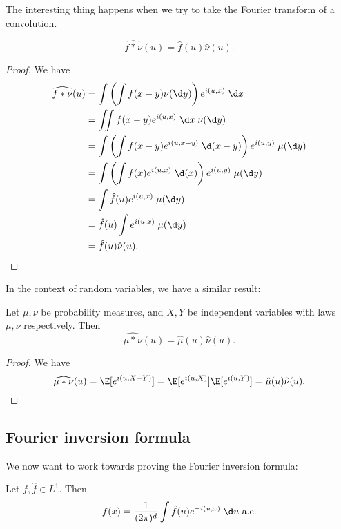 \documentclass[a4paper]{article}
\begin{document}
The interesting thing happens when we try to take the Fourier transform of a convolution.
\begin{prop}
  \[
    \widehat{f * \nu}(u) = \hat{f}(u) \hat{\nu}(u).
  \]
\end{prop}

\begin{proof}
  We have
  \begin{align*}
    \widehat{f * \nu}(u) &= \int \left(\int f(x - y) \nu(\d y)\right) e^{i(u, x)}\;\d x\\
    &= \iint f(x - y) e^{i(u, x)} \;\d x\;\nu (\d y)\\
    &= \int \left(\int f(x - y) e^{i(u, x - y)} \;\d (x - y)\right) e^{i(u, y)}\;\mu(\d y)\\
    &= \int \left(\int f(x) e^{i(u, x)} \;\d (x)\right) e^{i(u, y)}\;\mu(\d y)\\
    &= \int \hat{f}(u) e^{i(u, x)}\;\mu(\d y)\\
    &= \hat{f}(u) \int e^{i(u, x)}\;\mu(\d y)\\
    &= \hat{f}(u) \hat{\nu}(u).\qedhere
  \end{align*}
\end{proof}

In the context of random variables, we have a similar result:
\begin{prop}
  Let $\mu, \nu$ be probability measures, and $X, Y$ be independent variables with laws $\mu, \nu$ respectively. Then
  \[
    \widehat{\mu * \nu}(u) = \hat{\mu}(u) \hat{\nu}(u).
  \]
\end{prop}

\begin{proof}
  We have
  \[
    \widehat{\mu * \nu}(u) = \E[e^{i(u, X + Y)}] = \E[e^{i(u, X)}] \E[e^{i(u, Y)}] = \hat{\mu}(u) \hat{\nu}(u).\qedhere
  \]
\end{proof}

\subsection{Fourier inversion formula}
We now want to work towards proving the Fourier inversion formula:
\begin{thm}
  Let $f,\hat{f} \in L^1$. Then
  \[
    f(x) = \frac{1}{(2\pi)^d} \int \hat{f}(u) e^{-i(u, x)} \;\d u\text{ a.e.}
  \]
\end{thm}
\end{document}
